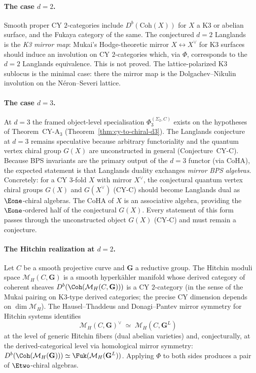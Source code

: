 \paragraph{The case \texorpdfstring{$d = 2$}{d = 2}.} Smooth proper CY $2$-categories include $D^b(\mathrm{Coh}(X))$ for $X$ a K3 or abelian surface, and the Fukaya category of the same. The conjectured $d = 2$ Langlands is the \emph{K3 mirror map}: Mukai's Hodge-theoretic mirror $X \leftrightarrow X^\vee$ for K3 surfaces should induce an involution on CY $2$-categories which, via $\Phi$, corresponds to the $d = 2$ Langlands equivalence. This is not proved. The lattice-polarized K3 sublocus is the minimal case: there the mirror map is the Dolgachev--Nikulin involution on the N\'eron--Severi lattice.

\paragraph{The case \texorpdfstring{$d = 3$}{d = 3}.}
At \(d=3\) the framed object-level specialisation
\(\Phi_3^{(\Sigma_2,C)}\) exists on the hypotheses of Theorem~CY-A$_3$
(Theorem~\ref{thm:cy-to-chiral-d3}). The Langlands conjecture at
\(d=3\) remains speculative because arbitrary functoriality and the
quantum vertex chiral group \(G(X)\) are unconstructed in general
(Conjecture~CY-C).
Because BPS invariants are the primary output of the $d = 3$ functor (via CoHA), the expected statement is that Langlands duality exchanges \emph{mirror BPS algebras}.
Concretely: for a CY $3$-fold $X$ with mirror $X^\vee$, the conjectural quantum vertex chiral groups $G(X)$ and $G(X^\vee)$ (CY-C) should become Langlands dual as $\Eone$-chiral algebras.
The CoHA of $X$ is an associative algebra, providing the $\Eone$-ordered half of the conjectural $G(X)$.
Every statement of this form passes through the unconstructed object $G(X)$ (CY-C) and must remain a conjecture.

\paragraph{The Hitchin realization at \texorpdfstring{$d = 2$}{d = 2}.}
Let $C$ be a smooth projective curve and $\mathbf{G}$ a reductive group.
The Hitchin moduli space $\mathcal{M}_H(C, \mathbf{G})$ is a smooth hyperk\"ahler manifold whose derived category of coherent sheaves $D^b(\Coh(\mathcal{M}_H(C, \mathbf{G})))$ is a CY $2$-category (in the sense of the Mukai pairing on K3-type derived categories; the precise CY dimension depends on $\dim \mathcal{M}_H$).
The Hausel--Thaddeus and Donagi--Pantev mirror symmetry for Hitchin systems identifies
\[
 \mathcal{M}_H(C, \mathbf{G})^\vee \;\simeq\; \mathcal{M}_H(C, \mathbf{G}^L)
\]
at the level of generic Hitchin fibers (dual abelian varieties) and, conjecturally, at the derived-categorical level via homological mirror symmetry: $D^b(\Coh(\mathcal{M}_H(\mathbf{G}))) \simeq \Fuk(\mathcal{M}_H(\mathbf{G}^L))$.
Applying $\Phi$ to both sides produces a pair of $\Etwo$-chiral algebras.

